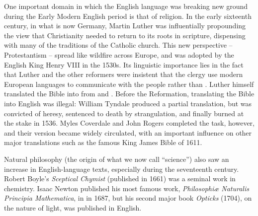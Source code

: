 \hspace*{-5pt}One important domain in which the English language was breaking new ground during the Early Modern English period is that of religion. In the early sixteenth century, in what is now Germany, Martin Luther was influentially propounding the view that Christianity needed to return to its roots in scripture, dispensing with many of the traditions of the Catholic church. This new perspective -- Protestantism -- spread like wildfire across Europe, and was adopted by the English King Henry VIII in the 1530s. Its linguistic importance lies in the fact that Luther and the other reformers were insistent that the clergy use modern European languages to communicate with the people rather than . Luther himself translated the Bible into  from  and . Before the Reformation, translating the Bible into English was illegal: William Tyndale produced a partial translation, but was convicted of heresy, sentenced to death by strangulation, and finally burned at the stake in 1536. Myles Coverdale and John Rogers completed the task, however, and their version became widely circulated, with an important influence on other major translations such as the famous King James Bible of 1611.

Natural philosophy (the origin of what we now call ``science'') also saw an increase in English-language texts, especially during the seventeenth century. Robert Boyle's \textit{Sceptical Chymist} (published in 1661) was a seminal work in chemistry. Isaac Newton published his most famous work, \textit{Philosophiæ Naturalis Principia Mathematica}, in  in 1687, but his second major book \textit{Opticks} (1704), on the nature of light, was published in English.

